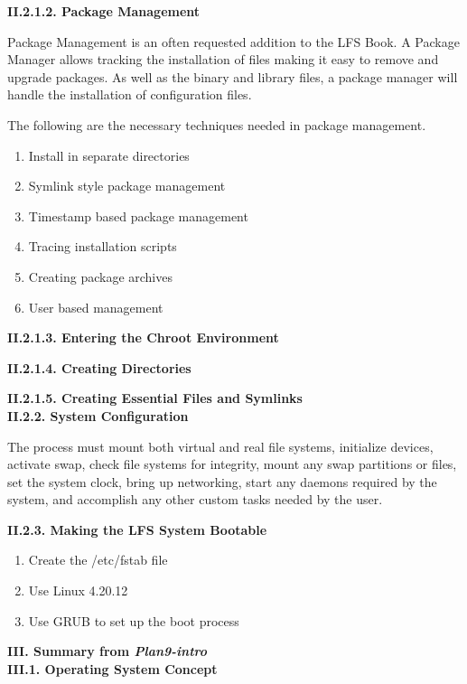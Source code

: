 \documentclass[a4paper,12pt]{report}
\begin{document}
\noindent
\textbf{II.2.1.2. Package Management}

\noindent
Package  Management  is  an  often  requested  addition  to  the  LFS  Book.  A  Package  Manager  allows  tracking  the installation of files making it easy to remove and upgrade packages. As well as the binary and library files, a package manager will handle the installation of configuration files.

\noindent
The following are the necessary techniques needed in package management. 

\begin{enumerate}
\item Install in separate directories
\item Symlink style package management
\item Timestamp based package management 
\item Tracing installation scripts
\item Creating package archives
\item User based management
\end{enumerate}

\noindent
\textbf{II.2.1.3. Entering the Chroot Environment}

\noindent
\textbf{II.2.1.4. Creating Directories}

\noindent
\textbf{II.2.1.5. Creating Essential Files and Symlinks}\\

\noindent
\textbf{II.2.2. System Configuration}

\noindent
The process must mount both virtual and real file systems, initialize
devices, activate swap, check file systems for integrity, mount any swap partitions or files, set the system clock, bring
up networking, start any daemons required by the system, and accomplish any other custom tasks needed by the user.

\noindent
\textbf{II.2.3. Making the LFS System Bootable}

\begin{enumerate}
\item Create the /etc/fstab file
\item Use Linux 4.20.12
\item Use GRUB to set up the boot process
\end{enumerate}

\noindent
\textbf{III. Summary from \textit{Plan9-intro}}\\

\noindent
\textbf{III.1. Operating System Concept}
\end{document}

